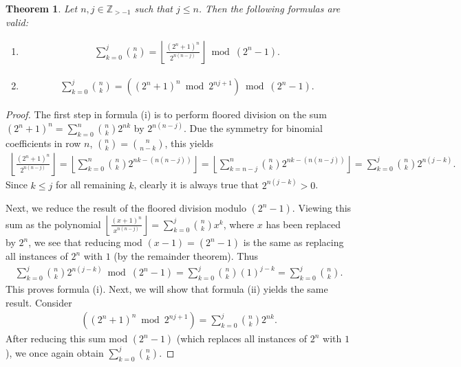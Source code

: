 \documentclass[10pt]{article}
\theoremstyle{plain}
\newtheorem{theorem}{Theorem}[section]
\newcommand{\floor}[1]{\left\lfloor #1 \right\rfloor}
\newcommand{\Z}{\mathbb{Z}}
\begin{document}
\begin{theorem} \label{proof:binomialcoeffpartialsums}
Let $n,j \in \Z_{>-1}$ such that $j \leq n$. Then the following formulas are valid:
\begin{enumerate}
\item[(i)]
    \begin{align*}
    \sum_{k=0}^{j} \binom{n}{k}
    = \floor{\frac{(2^n+1)^n}{2^{n(n-j)}}} \bmod (2^n-1) .
    \end{align*}
\item[(ii)]
    \begin{align*}
    \sum_{k=0}^{j} \binom{n}{k}
    = \left( (2^n+1)^n \bmod 2^{nj+1} \right) \bmod (2^n-1) .
    \end{align*}
\end{enumerate}
\end{theorem}
\begin{proof}
The first step in formula (i) is to perform floored division on the sum $(2^n+1)^n = \sum_{k=0}^n \binom{n}{k} 2^{nk}$ by $2^{n(n-j)}$. Due the symmetry for binomial coefficients in row $n$, $\binom{n}{k} = \binom{n}{n-k}$, this yields
\begin{align*}
    \floor{\frac{(2^n+1)^n}{2^{n(n-j)}}}
    = \floor{ \sum_{k=0}^{n} \binom{n}{k} 2^{nk-(n(n-j))} }
    = \floor{ \sum_{k=n-j}^{n} \binom{n}{k} 2^{nk-(n(n-j))} }
    = \sum_{k=0}^{j} \binom{n}{k} 2^{n(j-k)} .
\end{align*}
Since $k \leq j$ for all remaining $k$, clearly it is always true that $2^{n(j-k)} > 0$.

Next, we reduce the result of the floored division modulo $(2^n-1)$. Viewing this sum as the polynomial $\floor{\frac{(x+1)^n}{x^{n(n-j)}}} = \sum_{k=0}^{j} \binom{n}{k} x^k$, where $x$ has been replaced by $2^n$, we see that reducing mod $(x-1) = (2^n-1)$ is the same as replacing all instances of $2^n$ with $1$ (by the remainder theorem). Thus
\begin{align*}
    \sum_{k=0}^{j} \binom{n}{k} 2^{n(j-k)} \bmod (2^n-1)
    = \sum_{k=0}^{j} \binom{n}{k} (1)^{j-k}
    = \sum_{k=0}^{j} \binom{n}{k} .
\end{align*}
This proves formula (i). Next, we will show that formula (ii) yields the same result. Consider
\begin{align*}
    \left( (2^n+1)^n \bmod 2^{nj+1} \right)
    = \sum_{k=0}^{j} \binom{n}{k} 2^{nk} .
\end{align*}
After reducing this sum mod $(2^n-1)$ (which replaces all instances of $2^n$ with $1$), we once again obtain $\sum_{k=0}^{j} \binom{n}{k}$.
\end{proof}
\end{document}
